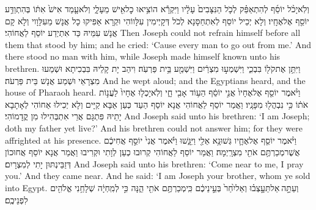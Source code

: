 \newperek
{}%
{וְלֹֽא\maqqaf יָכֹ֨ל יוֹסֵ֜ף לְהִתְאַפֵּ֗ק לְכֹ֤ל הַנִּצָּבִים֙ עָלָ֔יו וַיִּקְרָ֕א הוֹצִ֥יאוּ כׇל\maqqaf אִ֖ישׁ מֵעָלָ֑י וְלֹא\maqqaf עָ֤מַד אִישׁ֙ אִתּ֔וֹ בְּהִתְוַדַּ֥ע יוֹסֵ֖ף אֶל\maqqaf אֶחָֽיו׃}
{וְלָא יְכֵיל יוֹסֵף לְאִתְחַסָּנָא לְכֹל דְּקָיְימִין עִלָּווֹהִי וּקְרָא אַפִּיקוּ כָל אֲנָשׁ מֵעִלָּוָוי וְלָא קָם אֲנָשׁ עִמֵּיהּ כַּד אִתְיְדַע יוֹסֵף לַאֲחוֹהִי׃}
{Then Joseph could not refrain himself before all them that stood by him; and he cried: ‘Cause every man to go out from me.’ And there stood no man with him, while Joseph made himself known unto his brethren.}{}
{וַיִּתֵּ֥ן אֶת\maqqaf קֹל֖וֹ בִּבְכִ֑י וַיִּשְׁמְע֣וּ מִצְרַ֔יִם וַיִּשְׁמַ֖ע בֵּ֥ית פַּרְעֹֽה׃}
{וִיהַב יָת קָלֵיהּ בִּבְכִיתָא וּשְׁמַעוּ מִצְרָאֵי וּשְׁמַע אֲנָשׁ בֵּית פַּרְעֹה׃}
{And he wept aloud; and the Egyptians heard, and the house of Pharaoh heard.}{}
{וַיֹּ֨אמֶר יוֹסֵ֤ף אֶל\maqqaf אֶחָיו֙ אֲנִ֣י יוֹסֵ֔ף הַע֥וֹד אָבִ֖י חָ֑י וְלֹֽא\maqqaf יָכְל֤וּ אֶחָיו֙ לַעֲנ֣וֹת אֹת֔וֹ כִּ֥י נִבְהֲל֖וּ מִפָּנָֽיו׃}
{וַאֲמַר יוֹסֵף לַאֲחוֹהִי אֲנָא יוֹסֵף הַעַד כְּעַן אַבָּא קַיָּים וְלָא יְכִילוּ אַחוֹהִי לְאָתָבָא יָתֵיהּ פִּתְגָּם אֲרֵי אִתְבְּהִילוּ מִן קֳדָמוֹהִי׃}
{And Joseph said unto his brethren: ‘I am Joseph; doth my father yet live?’ And his brethren could not answer him; for they were affrighted at his presence.}{}
{וַיֹּ֨אמֶר יוֹסֵ֧ף אֶל\maqqaf אֶחָ֛יו גְּשׁוּ\maqqaf נָ֥א אֵלַ֖י וַיִּגָּ֑שׁוּ וַיֹּ֗אמֶר אֲנִי֙ יוֹסֵ֣ף אֲחִיכֶ֔ם אֲשֶׁר\maqqaf מְכַרְתֶּ֥ם אֹתִ֖י מִצְרָֽיְמָה׃}
{וַאֲמַר יוֹסֵף לַאֲחוֹהִי קְרוּבוּ כְעַן לְוָתִי וּקְרִיבוּ וַאֲמַר אֲנָא יוֹסֵף אֲחוּכוֹן דְּזַבֵּינְתּוּן יָתִי לְמִצְרָיִם׃}
{And Joseph said unto his brethren: ‘Come near to me, I pray you.’ And they came near. And he said: ‘I am Joseph your brother, whom ye sold into Egypt.}{}
{וְעַתָּ֣ה \legarmeh  אַל\maqqaf תֵּעָ֣צְב֗וּ וְאַל\maqqaf יִ֙חַר֙ בְּעֵ֣ינֵיכֶ֔ם כִּֽי\maqqaf מְכַרְתֶּ֥ם אֹתִ֖י הֵ֑נָּה כִּ֣י לְמִֽחְיָ֔ה שְׁלָחַ֥נִי אֱלֹהִ֖ים לִפְנֵיכֶֽם׃}

